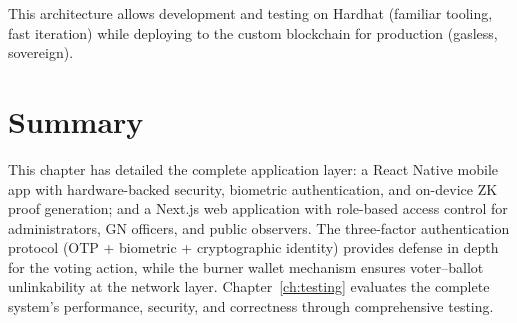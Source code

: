 This architecture allows development and testing on Hardhat (familiar tooling, fast iteration) while deploying to the custom blockchain for production (gasless, sovereign).

\section{Summary}

This chapter has detailed the complete application layer: a React Native mobile app with hardware-backed security, biometric authentication, and on-device ZK proof generation; and a Next.js web application with role-based access control for administrators, GN officers, and public observers. The three-factor authentication protocol (OTP + biometric + cryptographic identity) provides defense in depth for the voting action, while the burner wallet mechanism ensures voter--ballot unlinkability at the network layer. Chapter~\ref{ch:testing} evaluates the complete system's performance, security, and correctness through comprehensive testing.
